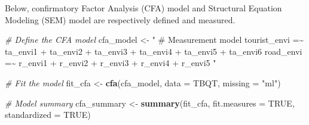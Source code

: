 \documentclass[
11pt, %
oneside, %
english, %
singlespacing, %
]{macthesis} %
\newenvironment{Shaded}{\begin{snugshade}}{\end{snugshade}}
\newcommand{\AttributeTok}[1]{\textcolor[rgb]{0.13,0.29,0.53}{#1}}
\newcommand{\CommentTok}[1]{\textcolor[rgb]{0.56,0.35,0.01}{\textit{#1}}}
\newcommand{\ConstantTok}[1]{\textcolor[rgb]{0.56,0.35,0.01}{#1}}
\newcommand{\FunctionTok}[1]{\textcolor[rgb]{0.13,0.29,0.53}{\textbf{#1}}}
\newcommand{\NormalTok}[1]{#1}
\newcommand{\OtherTok}[1]{\textcolor[rgb]{0.56,0.35,0.01}{#1}}
\newcommand{\StringTok}[1]{\textcolor[rgb]{0.31,0.60,0.02}{#1}}
\begin{document}
Below, confirmatory Factor Analysis (CFA) model and Structural Equation Modeling (SEM) model are respectively defined and measured.

\begin{Shaded}
\begin{Highlighting}[]
\CommentTok{\# Define the CFA model}
\NormalTok{cfa\_model }\OtherTok{\textless{}{-}} \StringTok{"}
\StringTok{\# Measurement model}
\StringTok{tourist\_envi =\textasciitilde{} ta\_envi1 + ta\_envi2 + ta\_envi3 + ta\_envi4 + ta\_envi5 }
\StringTok{  + ta\_envi6}
\StringTok{road\_envi =\textasciitilde{} r\_envi1 + r\_envi2 + r\_envi3 + r\_envi4 + r\_envi5}
\StringTok{"}

\CommentTok{\# Fit the model}
\NormalTok{fit\_cfa }\OtherTok{\textless{}{-}} \FunctionTok{cfa}\NormalTok{(cfa\_model, }\AttributeTok{data =}\NormalTok{ TBQT, }\AttributeTok{missing =} \StringTok{"ml"}\NormalTok{)}

\CommentTok{\# Model summary}
\NormalTok{cfa\_summary }\OtherTok{\textless{}{-}} \FunctionTok{summary}\NormalTok{(fit\_cfa, }\AttributeTok{fit.measures =} \ConstantTok{TRUE}\NormalTok{, }\AttributeTok{standardized =} \ConstantTok{TRUE}\NormalTok{)}
\end{Highlighting}
\end{Shaded}
\end{document}
